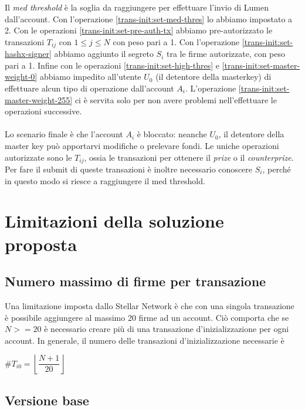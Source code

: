 Il \textit{med threshold} è la soglia da raggiungere per effettuare
l'invio di Lumen dall'account.
Con l'operazione \ref{trans-init:set-med-thres} lo abbiamo impostato a 2.
Con le operazioni \ref{trans-init:set-pre-auth-tx} abbiamo pre-autorizzato
le transazioni
$ T_{ij} $ con $ 1 \leq j \leq N $ con peso pari a 1.
Con l'operazione \ref{trans-init:set-hashx-signer} abbiamo aggiunto il segreto
$ S_i $ tra le firme autorizzate, con peso pari a 1.
Infine con le operazioni \ref{trans-init:set-high-thres} e
\ref{trans-init:set-master-weight-0} abbiamo impedito all'utente $ U_0 $ (il
detentore della masterkey) di effettuare alcun tipo di operazione dall'account $ A_i $.
L'operazione \ref{trans-init:set-master-weight-255} ci è servita solo per
non avere problemi
nell'effettuare le operazioni successive.
\\
\\
Lo scenario finale è che l'account $ A_i $ è bloccato: neanche $ U_0 $, il detentore
della master key può apportarvi modifiche o prelevare fondi. Le uniche operazioni
autorizzate sono le $ T_{ij} $, ossia le transazioni per ottenere il \textit{prize}
o il \textit{counterprize}. Per fare il submit di queste transazioni è inoltre
necessario conoscere $ S_i $, perché in questo modo si riesce a raggiungere
il med threshold.

\section{Limitazioni della soluzione proposta}

\subsection{Numero massimo di firme per transazione}
Una limitazione imposta dallo Stellar Network è che con
una singola transazione è possibile aggiungere al massimo 20 firme ad un account.
Ciò comporta che se $ N >= 20 $ è necessario creare più di una transazione
d'inizializzazione per ogni account.
In generale, il numero delle transazioni d'inizializzazione necessarie è
\begin{center}
	$ \# T_{i0} = \left\lfloor\dfrac{ N + 1 }{ 20 }\right\rfloor $
\end{center}

\subsection{Versione base}




